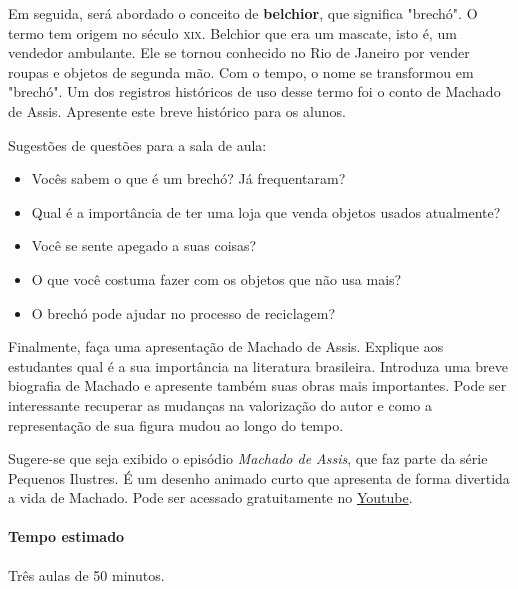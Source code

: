 \documentclass[11pt]{extarticle}
\begin{document}
Em seguida, será abordado o conceito de \textbf{belchior}, que significa "brechó". O termo tem origem no século \textsc{xix}. Belchior que era um mascate, isto é, um vendedor ambulante. Ele se tornou conhecido no Rio de Janeiro por vender roupas e objetos de segunda mão. Com o tempo, o nome se transformou em "brechó". Um dos registros históricos de uso desse termo foi o conto de Machado de Assis. Apresente este breve histórico para os alunos.


Sugestões de questões para a sala de aula:

\begin{itemize}

\item Vocês sabem o que é um brechó? Já frequentaram?

\item Qual é a importância de ter uma loja que venda objetos usados atualmente?

\item Você se sente apegado a suas coisas?

\item O que você costuma fazer com os objetos que não usa mais?

\item O brechó pode ajudar no processo de reciclagem?

\end{itemize}

Finalmente, faça uma apresentação de Machado de Assis. Explique aos estudantes qual é a sua importância na literatura brasileira. Introduza uma breve biografia de Machado e apresente também suas obras mais importantes. Pode ser interessante recuperar as mudanças na valorização do autor e como a representação de sua figura mudou ao longo do tempo. 

Sugere-se que seja exibido o episódio \textit{Machado de Assis}, que faz parte da série Pequenos Ilustres. É um desenho animado curto que apresenta de forma divertida a vida de Machado. Pode ser acessado gratuitamente no \href{https://youtu.be/ahafgLr7M0I}{Youtube}.

\paragraph{Tempo estimado} Três aulas de 50 minutos.
\end{document}
